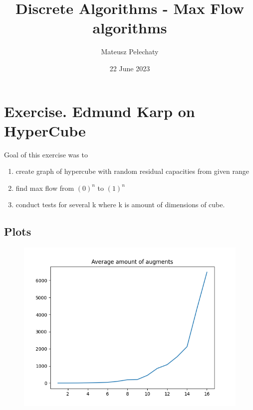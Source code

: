 \documentclass[11pt]{article}
\title{Discrete Algorithms - Max Flow algorithms}
\author{Mateusz Pełechaty}
\date{22 June 2023}%
\begin{document}
\maketitle
\section{Exercise. Edmund Karp on HyperCube}
Goal of this exercise was to 
\begin{enumerate}
    \item create graph of hypercube with random residual capacities from given range
    \item find max flow from $(0)^n$ to $(1)^n$
    \item conduct tests for several k where k is amount of dimensions of cube.
\end{enumerate} 
\subsection{Plots}

\begin{figure}[h!]
    \includegraphics{plots/augments.png} 
\end{figure}
\end{document}
